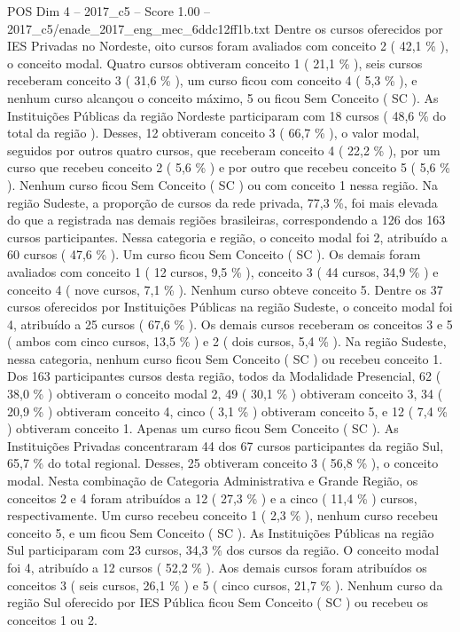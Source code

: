 \begin{textsample}{POS Dim 4 – 2017\_c5 – Score 1.00 – 2017\_c5/enade\_2017\_eng\_mec\_6ddc12ff1b.txt}
Dentre os cursos oferecidos por IES Privadas no Nordeste, oito cursos foram avaliados com conceito 2 ( 42,1 \% ), o conceito modal.
Quatro cursos obtiveram conceito 1 ( 21,1 \% ), seis cursos receberam conceito 3 ( 31,6 \% ), um curso ficou com conceito 4 ( 5,3 \% ), e nenhum curso alcançou o conceito máximo, 5 ou ficou Sem Conceito ( SC ).
As Instituições Públicas da região Nordeste participaram com 18 cursos ( 48,6 \% do total da região ).
Desses, 12 obtiveram conceito 3 ( 66,7 \% ), o valor modal, seguidos por outros quatro cursos, que receberam conceito 4 ( 22,2 \% ), por um curso que recebeu conceito 2 ( 5,6 \% ) e por outro que recebeu conceito 5 ( 5,6 \% ).
Nenhum curso ficou Sem Conceito ( SC ) ou com conceito 1 nessa região.
Na região Sudeste, a proporção de cursos da rede privada, 77,3 \%, foi mais elevada do que a registrada nas demais regiões brasileiras, correspondendo a 126 dos 163 cursos participantes.
Nessa categoria e região, o conceito modal foi 2, atribuído a 60 cursos ( 47,6 \% ).
Um curso ficou Sem Conceito ( SC ).
Os demais foram avaliados com conceito 1 ( 12 cursos, 9,5 \% ), conceito 3 ( 44 cursos, 34,9 \% ) e conceito 4 ( nove cursos, 7,1 \% ).
Nenhum curso obteve conceito 5.
Dentre os 37 cursos oferecidos por Instituições Públicas na região Sudeste, o conceito modal foi 4, atribuído a 25 cursos ( 67,6 \% ).
Os demais cursos receberam os conceitos 3 e 5 ( ambos com cinco cursos, 13,5 \% ) e 2 ( dois cursos, 5,4 \% ).
Na região Sudeste, nessa categoria, nenhum curso ficou Sem Conceito ( SC ) ou recebeu conceito 1.
Dos 163 participantes cursos desta região, todos da Modalidade Presencial, 62 ( 38,0 \% ) obtiveram o conceito modal 2, 49 ( 30,1 \% ) obtiveram conceito 3, 34 ( 20,9 \% ) obtiveram conceito 4, cinco ( 3,1 \% ) obtiveram conceito 5, e 12 ( 7,4 \% ) obtiveram conceito 1.
Apenas um curso ficou Sem Conceito ( SC ).
As Instituições Privadas concentraram 44 dos 67 cursos participantes da região Sul, 65,7 \% do total regional.
Desses, 25 obtiveram conceito 3 ( 56,8 \% ), o conceito modal.
Nesta combinação de Categoria Administrativa e Grande Região, os conceitos 2 e 4 foram atribuídos a 12 ( 27,3 \% ) e a cinco ( 11,4 \% ) cursos, respectivamente.
Um curso recebeu conceito 1 ( 2,3 \% ), nenhum curso recebeu conceito 5, e um ficou Sem Conceito ( SC ).
As Instituições Públicas na região Sul participaram com 23 cursos, 34,3 \% dos cursos da região.
O conceito modal foi 4, atribuído a 12 cursos ( 52,2 \% ).
Aos demais cursos foram atribuídos os conceitos 3 ( seis cursos, 26,1 \% ) e 5 ( cinco cursos, 21,7 \% ).
Nenhum curso da região Sul oferecido por IES Pública ficou Sem Conceito ( SC ) ou recebeu os conceitos 1 ou 2.

\end{textsample}
